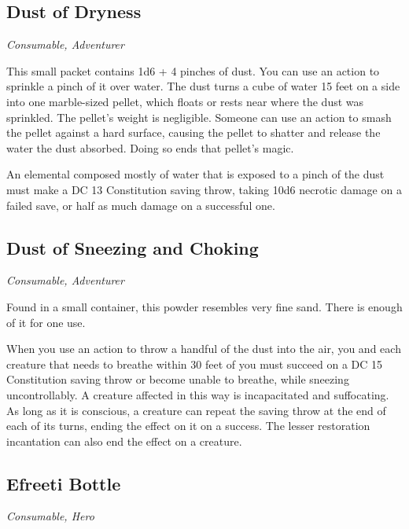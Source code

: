 \subsection{Dust of Dryness}
\textit{Consumable, Adventurer}

This small packet contains 1d6 + 4 pinches of dust. You can use an action to sprinkle a pinch of it over water. The dust turns a cube of water 15 feet on a side into one marble-sized pellet, which floats or rests near where the dust was sprinkled. The pellet's weight is negligible.
Someone can use an action to smash the pellet against a hard surface, causing the pellet to shatter and release the water the dust absorbed. Doing so ends that pellet's magic.

An elemental composed mostly of water that is exposed to a pinch of the dust must make a DC 13 Constitution saving throw, taking 10d6 necrotic damage on a failed save, or half as much damage on a successful one.

\subsection{Dust of Sneezing and Choking}
\textit{Consumable, Adventurer}

Found in a small container, this powder resembles very fine sand. There is enough of it for one use.

When you use an action to throw a handful of the dust into the air, you and each creature that needs to breathe within 30 feet of you must succeed on a DC 15 Constitution saving throw or become unable to breathe, while sneezing uncontrollably. A creature affected in this way is incapacitated and suffocating. As long as it is conscious, a creature can repeat the saving throw at the end of each of its turns, ending the effect on it on a success. The lesser restoration incantation can also end the effect on a creature.

\subsection{Efreeti Bottle}
\textit{Consumable, Hero}

